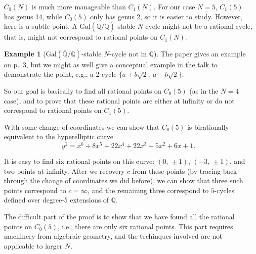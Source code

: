 \documentclass{amsart}
\theoremstyle{plain}
\theoremstyle{definition}
\newtheorem{example}[theorem]{Example}
\theoremstyle{remark}
\newcommand{\Q}{\mathbb{Q}}
\newcommand{\gal}{\mathrm{Gal}}
\begin{document}
$C_0(N)$ is much more manageable than $C_1(N)$. For our case $N = 5$,
$C_1(5)$ has genus 14, while $C_0(5)$ only has genus 2, so it is
easier to study. However, here is a subtle point. A
$\gal(\bar{\Q}/\Q)$-stable $N$-cycle might not be a rational cycle,
that is, might not correspond to rational points on $C_1(N)$.

\begin{example}[$\gal(\bar{\Q}/\Q)$-stable $N$-cycle not in $\Q$]
  The paper gives an example on p.~3, but we might as well give a
  conceptual example in the talk to demonstrate the point, e.g., a
  2-cycle $\{a + b \sqrt{2},\ a - b \sqrt{2}\}$.
\end{example}

So our goal is basically to find all rational points on $C_0(5)$ (as
in the $N=4$ case), and to prove that these rational points are either
at infinity or do not correspond to rational points on $C_1(5)$.

With some change of coordinates we can show that $C_0(5)$ is
birationally equivalent to the hyperelliptic curve
\[
y^2 = x^6 + 8x^5 + 22x^4 + 22x^3 + 5x^2 + 6x + 1.
\]

It is easy to find six rational points on this curve: $(0,\, \pm 1)$,
$(-3,\, \pm 1)$, and two points at infinity. After we recovery $c$
from these points (by tracing back through the change of coordinates
we did before), we can show that three such points correspond to $c =
\infty$, and the remaining three correspond to $5$-cycles defined over
degree-5 extensions of $\Q$.

The difficult part of the proof is to show that we have found all the
rational points on $C_0(5)$, i.e., there are only six rational
points. This part requires machinery from algebraic geometry, and the
techinques involved are not applicable to larger $N$.
\end{document}
